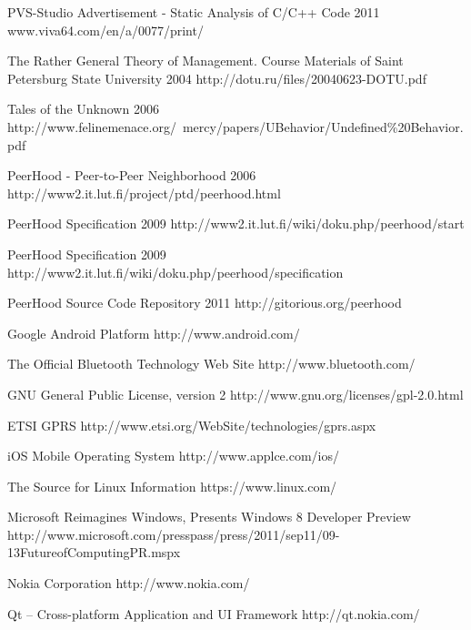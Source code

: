 \begin{thebibliography}{9}
		{
			\BibAnd
			}
		{PVS-Studio Advertisement - Static Analysis of C/C++ Code}
		{2011}
		{www.viva64.com/en/a/0077/print/}


		{The Rather General Theory of Management. Course Materials of Saint Petersburg State
			University}
		{2004}
		{http://dotu.ru/files/20040623-DOTU.pdf}

		{Tales of the Unknown}
		{2006}
		{http://www.felinemenace.org/~mercy/papers/UBehavior/Undefined\%20Behavior.pdf}

		{PeerHood - Peer-to-Peer Neighborhood}
		{2006}
		{http://www2.it.lut.fi/project/ptd/peerhood.html}		

		{PeerHood Specification}
		{2009}
		{http://www2.it.lut.fi/wiki/doku.php/peerhood/start}

		{PeerHood Specification}
		{2009}
		{http://www2.it.lut.fi/wiki/doku.php/peerhood/specification}

		{PeerHood Source Code Repository}
		{2011}
		{http://gitorious.org/peerhood}
	

		{Google Android Platform}
		{http://www.android.com/}
	
		{The Official Bluetooth Technology Web Site}
		{http://www.bluetooth.com/}

		{GNU General Public License, version 2}
		{http://www.gnu.org/licenses/gpl-2.0.html}

		{ETSI GPRS}
		{http://www.etsi.org/WebSite/technologies/gprs.aspx}
	
		{iOS Mobile Operating System}
		{http://www.applce.com/ios/}

		{The Source for Linux Information}
		{https://www.linux.com/}

		{Microsoft Reimagines Windows, Presents Windows 8 Developer Preview}
		{http://www.microsoft.com/presspass/press/2011/sep11/09-13FutureofComputingPR.mspx}

		{Nokia Corporation}
		{http://www.nokia.com/}
		
		{Qt -- Cross-platform Application and UI Framework}
		{http://qt.nokia.com/}
	

\end{thebibliography}
